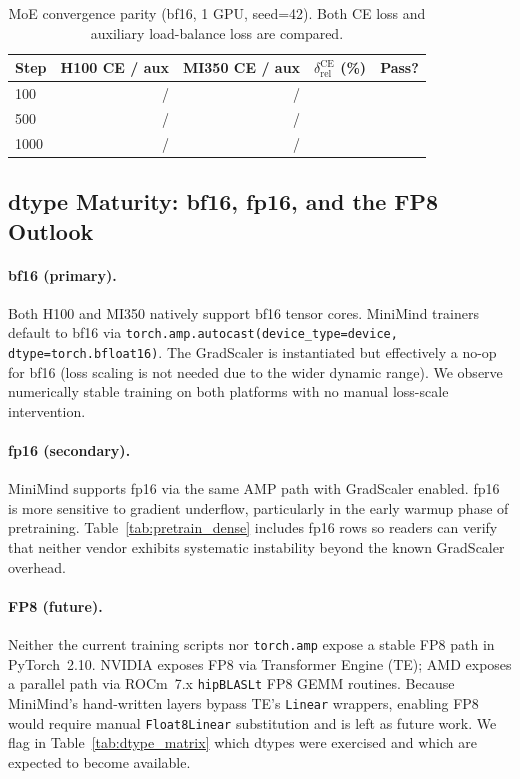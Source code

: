 \begin{table}[h]
\centering
\caption{MoE convergence parity (bf16, 1 GPU, seed=42).  Both CE loss and
auxiliary load-balance loss are compared.}
\label{tab:convergence_moe}
\small
\begin{tabular}{lrrrr}
\toprule
\textbf{Step} & \textbf{H100 CE / aux} & \textbf{MI350 CE / aux} & $\delta_{\text{rel}}^{\text{CE}}$ (\%) & \textbf{Pass?} \\
\midrule
100  & \PH{} / \PH{} & \PH{} / \PH{} & \PH{} & \PH{} \\
500  & \PH{} / \PH{} & \PH{} / \PH{} & \PH{} & \PH{} \\
1000 & \PH{} / \PH{} & \PH{} / \PH{} & \PH{} & \PH{} \\
\bottomrule
\end{tabular}
\end{table}

\subsection{dtype Maturity: bf16, fp16, and the FP8 Outlook}
\label{sec:crosscutting:dtype}

\paragraph{bf16 (primary).}
Both H100 and MI350 natively support bf16 tensor cores.  MiniMind trainers
default to bf16 via \texttt{torch.amp.autocast(device\_type=device, dtype=torch.bfloat16)}.
The GradScaler is instantiated but effectively a no-op for bf16 (loss scaling
is not needed due to the wider dynamic range).  We observe numerically stable
training on both platforms with no manual loss-scale intervention.

\paragraph{fp16 (secondary).}
MiniMind supports fp16 via the same AMP path with GradScaler enabled.  fp16
is more sensitive to gradient underflow, particularly in the early warmup
phase of pretraining.  Table~\ref{tab:pretrain_dense} includes fp16 rows so
readers can verify that neither vendor exhibits systematic instability beyond
the known GradScaler overhead.

\paragraph{FP8 (future).}
Neither the current training scripts nor \texttt{torch.amp} expose a stable
FP8 path in PyTorch~2.10.  NVIDIA exposes FP8 via Transformer Engine (TE);
AMD exposes a parallel path via ROCm~7.x \texttt{hipBLASLt} FP8 GEMM
routines.  Because MiniMind's hand-written layers bypass TE's
\texttt{Linear} wrappers, enabling FP8 would require manual \texttt{Float8Linear}
substitution and is left as future work.  We flag in
Table~\ref{tab:dtype_matrix} which dtypes were exercised and which are
expected to become available.


